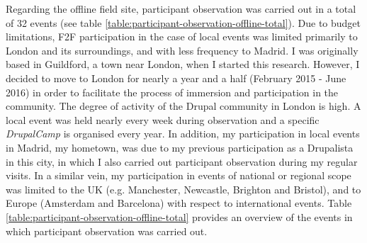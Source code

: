 Regarding the offline field site, participant observation was carried out in a total of 32 events (see table \ref{table:participant-observation-offline-total}). Due to budget limitations, F2F participation in the case of local events was limited primarily to London and its surroundings, and with less frequency to Madrid. I was originally based in Guildford, a town near London, when I started this research. However, I decided to move to London for nearly a year and a half (February 2015 - June 2016) in order to facilitate the process of immersion and participation in the community.  The degree of activity of the Drupal community in London is high. A local event was held nearly every week during observation and a specific \textit{DrupalCamp} is organised every year.  In addition, my participation in local events in Madrid, my hometown, was due to my previous participation as a Drupalista in this city, in which I also carried out participant observation during my regular visits. In a similar vein, my participation in events of national or regional scope was limited to the UK (e.g. Manchester, Newcastle, Brighton and Bristol), and to Europe (Amsterdam and Barcelona) with respect to international events. Table \ref{table:participant-observation-offline-total} provides an overview of the events in which participant observation was carried out.

